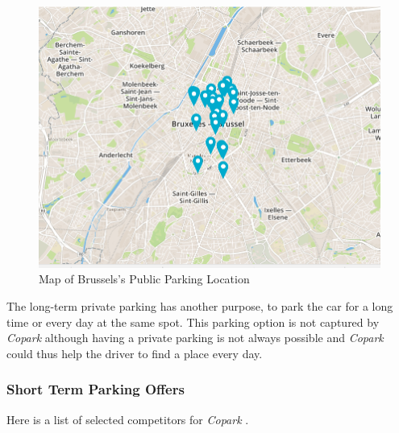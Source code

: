 \documentclass[12pt,a4paper,oneside]{book}
\newcommand{\bp}{\textit{Copark }}
\begin{document}
\begin{figure}[h]
\centering
\caption{Map of Brussels's Public Parking Location\cite{pubparkmap}}
\label{pubparcmap}
\includegraphics[keepaspectratio=true,width=\textwidth-2cm]{images/publicpark.png}
\end{figure}

The long-term private parking has another purpose, to park the car for a long time or every day at the same spot. This parking option is not captured by \bp although having a private parking is not always possible and \bp could thus help the driver to find a place every day.

\subsubsection{Short Term Parking Offers}

Here is a list of selected competitors for \bp .
\end{document}
